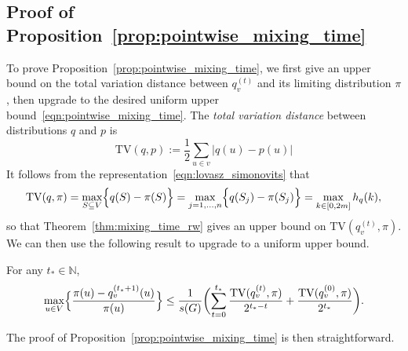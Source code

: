 \documentclass[twoside,11pt]{article}
\newcommand{\1}{\mathbf{1}}
\begin{document}
\subsection{Proof of Proposition~\ref{prop:pointwise_mixing_time}}
\label{subsec:pf_prop_pointwise_mixing_time}
To prove Proposition~\ref{prop:pointwise_mixing_time}, we first give an upper bound on the total variation distance between $q_v^{(t)}$ and its limiting distribution $\pi$, then upgrade to the desired uniform upper bound~\eqref{eqn:pointwise_mixing_time}. The \emph{total variation distance} between distributions $q$ and $p$ is
\begin{equation*}
\mathrm{TV}(q,p) := \frac{1}{2}\sum_{u \in v} \bigl|q(u) - p(u)\bigr|
\end{equation*}
It follows from the representation~\eqref{eqn:lovasz_simonovits} that
\begin{equation*}
\mathrm{TV}(q,\pi) = \max_{S \subseteq V} \Bigl\{q(S) - \pi(S)\Bigr\} = \max_{j = 1,\ldots,n} \Bigl\{q(S_j) - \pi(S_j)\Bigr\} = \max_{k \in [0,2m]} h_q(k),
\end{equation*}
so that Theorem~\ref{thm:mixing_time_rw} gives an upper bound on $\mathrm{TV}(q_v^{(t)},\pi)$. We can then use the following result to upgrade to a uniform upper bound.

\begin{lemma}
	\label{lem:tv_to_pointwise}
	For any $t_{\ast} \in \mathbb{N}$,
	\begin{equation*}
	\max_{u \in V} \Bigl\{\frac{\pi(u) - q_v^{(t_{\ast} + 1)}(u)}{\pi(u)}\Bigr\} \leq \frac{1}{s(G)} \biggl(\sum_{t = 0}^{t_{\ast}} \frac{\mathrm{TV}(q_v^{(t)}, \pi)}{2^{t_{\ast} - t}} + \frac{\mathrm{TV}(q_v^{(0)}, \pi)}{2^{t_{\ast}}}\biggr).
	\end{equation*}
\end{lemma}
The proof of Proposition~\ref{prop:pointwise_mixing_time} is then straightforward. \\
\end{document}
